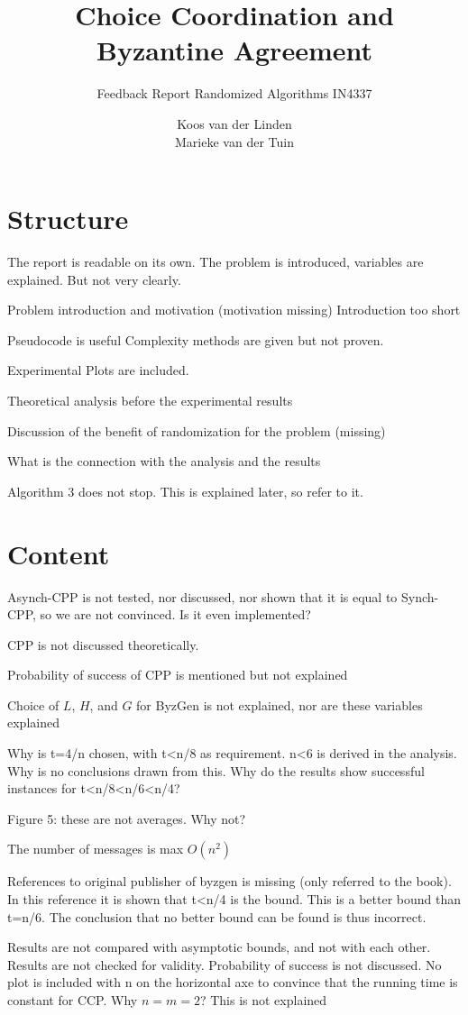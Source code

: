 \documentclass[nocopyrightspace]{acm_proc_article-sp}
\begin{document}
\title{Choice Coordination and Byzantine Agreement}
\subtitle{Feedback Report Randomized Algorithms IN4337}
\author{
\alignauthor
Koos van der Linden \\ 
\alignauthor
Marieke van der Tuin \\ 
}
\maketitle
\section{Structure}

The report is readable on its own. The problem is introduced, variables are explained. But not very clearly.

Problem introduction and motivation (motivation missing)
Introduction too short

Pseudocode is useful
Complexity methods are given but not proven.


Experimental Plots are included.



Theoretical analysis before the experimental results

Discussion of the benefit of randomization for the problem (missing)

What is the connection with the analysis and the results

Algorithm 3 does not stop. This is explained later, so refer to it.




\section{Content}


Asynch-CPP is not tested, nor discussed, nor shown that it is equal to Synch-CPP, so we are not convinced. Is it even implemented?

CPP is not discussed theoretically. 

Probability of success of CPP is mentioned but not explained

Choice of $L$, $H$, and $G$ for ByzGen is not explained, nor are these variables explained

Why is t=4/n chosen, with t<n/8 as requirement. n<6 is derived in the analysis. Why is no conclusions drawn from this.
Why do the results show successful instances for t<n/8<n/6<n/4?

Figure 5: these are not averages. Why not?

The number of messages is max $O(n^2)$

References to original publisher of byzgen is missing (only referred to the book).
In this reference it is shown that t<n/4 is the bound. This is a better bound than t=n/6. The conclusion that no better bound can be found is thus incorrect.

Results are not compared with asymptotic bounds, and not with each other.
Results are not checked for validity. Probability of success is not discussed.
No plot is included with n on the horizontal axe to convince that the running time is constant for CCP. Why $n=m=2$? This is not explained
\end{document}
